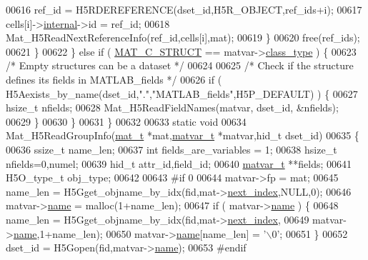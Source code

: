 \begin{DoxyCode}
00616                 ref\_id = H5RDEREFERENCE(dset\_id,H5R\_OBJECT,ref\_ids+i);
00617                 cells[i]->\hyperlink{group___m_a_t_a6e97e3ed9f40c49322c18561c2a94e92}{internal}->id = ref\_id;
00618                 Mat\_H5ReadNextReferenceInfo(ref\_id,cells[i],mat);
00619             \}
00620             free(ref\_ids);
00621         \}
00622     \} \textcolor{keywordflow}{else} \textcolor{keywordflow}{if} ( \hyperlink{group___m_a_t_ggad4d60ae7b709fc81bfd744fb4c857c40acb467c7749c80902b798134c729bb521}{MAT\_C\_STRUCT} == matvar->\hyperlink{group___m_a_t_aff13035bf3265dd7d9425e5d40c839d4}{class\_type} ) \{
00623         \textcolor{comment}{/* Empty structures can be a dataset */}
00624 
00625         \textcolor{comment}{/* Check if the structure defines its fields in MATLAB\_fields */}
00626         \textcolor{keywordflow}{if} ( H5Aexists\_by\_name(dset\_id,\textcolor{stringliteral}{"."},\textcolor{stringliteral}{"MATLAB\_fields"},H5P\_DEFAULT) ) \{
00627             hsize\_t nfields;
00628             Mat\_H5ReadFieldNames(matvar, dset\_id, &nfields);
00629         \}
00630     \}
00631 \}
00632 
00633 \textcolor{keyword}{static} \textcolor{keywordtype}{void}
00634 Mat\_H5ReadGroupInfo(\hyperlink{struct__mat__t}{mat\_t} *mat,\hyperlink{group___m_a_t_structmatvar__t}{matvar\_t} *matvar,hid\_t dset\_id)
00635 \{
00636     ssize\_t  name\_len;
00637     \textcolor{keywordtype}{int}      fields\_are\_variables = 1;
00638     hsize\_t  nfields=0,numel;
00639     hid\_t    attr\_id,field\_id;
00640     \hyperlink{group___m_a_t_structmatvar__t}{matvar\_t} **fields;
00641     H5O\_type\_t obj\_type;
00642 
00643 \textcolor{preprocessor}{#if 0}
00644     matvar->fp = mat;
00645     name\_len = H5Gget\_objname\_by\_idx(fid,mat->\hyperlink{struct__mat__t_a0163a12f9735356723bb604992639d9e}{next\_index},NULL,0);
00646     matvar->\hyperlink{group___m_a_t_a5d4b55b041e3b4fb50c04337f05ad909}{name} = malloc(1+name\_len);
00647     \textcolor{keywordflow}{if} ( matvar->\hyperlink{group___m_a_t_a5d4b55b041e3b4fb50c04337f05ad909}{name} ) \{
00648         name\_len = H5Gget\_objname\_by\_idx(fid,mat->\hyperlink{struct__mat__t_a0163a12f9735356723bb604992639d9e}{next\_index},
00649                                          matvar->\hyperlink{group___m_a_t_a5d4b55b041e3b4fb50c04337f05ad909}{name},1+name\_len);
00650         matvar->\hyperlink{group___m_a_t_a5d4b55b041e3b4fb50c04337f05ad909}{name}[name\_len] = \textcolor{charliteral}{'\(\backslash\)0'};
00651     \}
00652     dset\_id = H5Gopen(fid,matvar->\hyperlink{group___m_a_t_a5d4b55b041e3b4fb50c04337f05ad909}{name});
00653 \textcolor{preprocessor}{#endif}

\end{DoxyCode}
